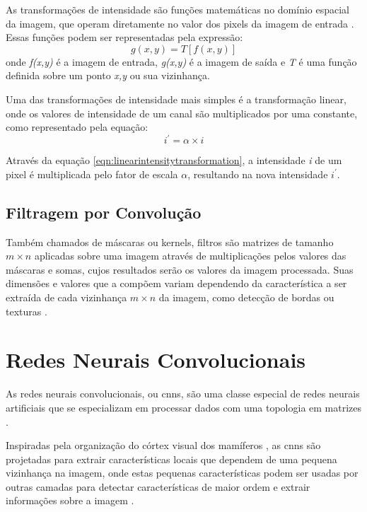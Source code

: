 As transformações de intensidade são funções matemáticas no domínio espacial da imagem, que operam diretamente no valor dos pixels da imagem de entrada \cite{gonzalez}.
Essas funções podem ser representadas pela expressão:
\begin{equation}
    \label{eqn:intensitytransformation}
    g(x,y) = T\left [ f(x,y) \right ]
\end{equation}
onde \textit{f(x,y)} é a imagem de entrada, \textit{g(x,y)} é a imagem de saída e \textit{T} é uma função definida sobre um ponto \textit{x,y} ou sua vizinhança.

Uma das transformações de intensidade mais simples é a transformação linear, onde os valores de intensidade de um canal são multiplicados por uma constante, como representado pela equação:
\begin{equation}
    \label{eqn:linearintensitytransformation}
    i^{'} = \alpha \times i
\end{equation}

Através da equação \ref{eqn:linearintensitytransformation}, a intensidade \textit{i} de um pixel é multiplicada pelo fator de escala $\alpha$, resultando na nova intensidade  $i^{'}$.

\subsection{Filtragem por Convolução}

Também chamados de máscaras ou kernels, filtros são matrizes de tamanho $m \times n$ aplicadas sobre uma imagem através de multiplicações pelos valores das máscaras e somas, cujos resultados serão os valores da imagem processada.
Suas dimensões e valores que a compõem variam dependendo da característica a ser extraída de cada vizinhança $m \times n$ da imagem, como detecção de bordas ou texturas \cite{shapiro}.
\section{Redes Neurais Convolucionais}

As redes neurais convolucionais, ou \acrshort{cnn}s, são uma classe especial de redes neurais artificiais que se especializam em processar dados com uma topologia em matrizes \cite{Goodfellow-et-al-2016}. 

Inspiradas pela organização do córtex visual dos mamíferos \cite{hubel1962}, as \acrshort{cnn}s são projetadas para 
extrair características locais que dependem de uma pequena vizinhança na imagem, onde estas pequenas características podem ser usadas por outras camadas para detectar características de maior ordem e extrair informações sobre a imagem \cite{book:Bishop}. 

